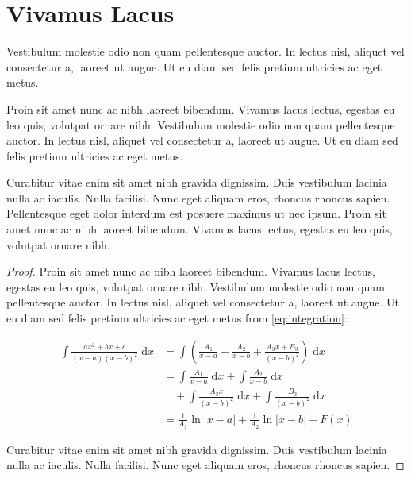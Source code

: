 \section{Vivamus Lacus}

Vestibulum molestie odio non quam pellentesque auctor. In lectus nisl, aliquet vel consectetur a, laoreet ut augue. Ut eu diam sed felis pretium ultricies ac eget metus.

Proin sit amet nunc ac nibh laoreet bibendum. Vivamus lacus lectus, egestas eu leo quis, volutpat ornare nibh. Vestibulum molestie odio non quam pellentesque auctor. In lectus nisl, aliquet vel consectetur a, laoreet ut augue. Ut eu diam sed felis pretium ultricies ac eget metus.

\begin{theorem}[Curabitur]
Curabitur vitae enim sit amet nibh gravida dignissim. Duis vestibulum lacinia nulla ac iaculis. Nulla facilisi. Nunc eget aliquam eros, rhoncus rhoncus sapien. Pellentesque eget dolor interdum est posuere maximus ut nec ipsum. Proin sit amet nunc ac nibh laoreet bibendum. Vivamus lacus lectus, egestas eu leo quis, volutpat ornare nibh.
\end{theorem}

\begin{proof}
Proin sit amet nunc ac nibh laoreet bibendum. Vivamus lacus lectus, egestas eu leo quis, volutpat ornare nibh. Vestibulum molestie odio non quam pellentesque auctor. In lectus nisl, aliquet vel consectetur a, laoreet ut augue. Ut eu diam sed felis pretium ultricies ac eget metus from \eqref{eq:integration}:

\begin{align}
\int \frac{ax^2+bx+c}{(x-a)(x-b)^2} \;\mathrm{d}x
& = \int \left( \frac{A_1}{x-a} + \frac{A_2}{x-b} + \frac{A_3x+B_3}{(x-b)^2} \right) \;\mathrm{d}x
\\ \nonumber
& = \int \frac{A_1}{x-a} \;\mathrm{d}x + \int \frac{A_2}{x-b} \;\mathrm{d}x 
\\
& \quad + \int \frac{A_3x}{(x-b)^2} \;\mathrm{d}x + \int \frac{B_3}{(x-b)^2} \;\mathrm{d}x
\\
& = \frac{1}{A_1} \ln \lvert x-a \rvert + \frac{1}{A_2}\ln \lvert x-b \rvert + F(x)
\end{align}

Curabitur vitae enim sit amet nibh gravida dignissim. Duis vestibulum lacinia nulla ac iaculis. Nulla facilisi. Nunc eget aliquam eros, rhoncus rhoncus sapien. 	
\end{proof}

